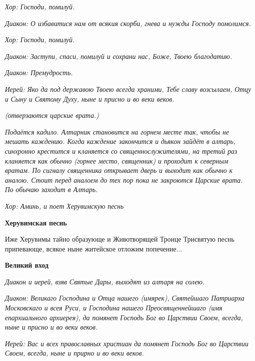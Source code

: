 \itshape Хор:\normalfont{} Господи, помилуй.


\itshape Диакон:\normalfont{} О избавитися нам от всякия скорби, гнева и нужды Господу помолимся.


\itshape Хор:\normalfont{} Господи, помилуй.


\itshape Диакон:\normalfont{} Заступи, спаси, помилуй и сохрани нас, Боже, Твоею благодатию.


\itshape Диакон:\normalfont{} Премудрость.


\itshape Иерей:\normalfont{} Яко да под державою Твоею всегда храними, Тебе славу возсылаем, Отцу и Сыну и Святому Духу, ныне и присно и во веки веков.


\itshape (отверзаются царские врата.)\normalfont{}


\itshape Подаётся кадило. Алтарник становится на горнем месте так, чтобы не мешать каждению. Когда каждение закончится и дьякон зайдёт в алтарь, синхронно крестится и кланяется со священнослужителями, на третий раз кланяется как обычно (горнее место, священник) и проходит к северным вратам. По сигналу священника открывает дверь и выходит как обычно к аналою. Стоит перед аналоем до тех пор пока не закроются Царские врата. По обычаю заходит в Алтарь\normalfont{}.


\itshape Хор:\normalfont{} Аминь, \itshape и поет Херувимскую песнь\normalfont{}





\bfseries Херувимская песнь\normalfont{}


Иже Херувимы тайно образующе и Животворящей Троице Трисвятую песнь припевающе, всякое ныне житейское отложим попечение...





\bfseries  Великий вход\normalfont{}


\itshape Диакон и иерей, взяв Святые Дары, выходят из алтаря на солею.\normalfont{}


\itshape Диакон:\normalfont{} Великаго Господина и Отца нашего \itshape (имярек),\normalfont{} Святейшаго Патриарха Московскаго и всея Руси, и Господина нашего Преосвященнейшаго \itshape (имя епархиального архиерея),\normalfont{} да помянет Господь Бог во Царствии Своем, всегда, ныне и присно и во веки веков.


\itshape Иерей:\normalfont{} Вас и всех православных христиан да помянет Господь Бог во Царствии Своем, всегда, ныне и прирно и во веки веков.


